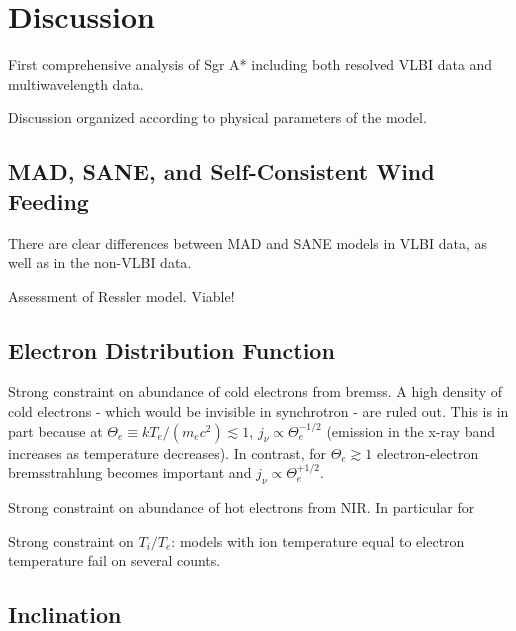 \section{Discussion}\label{sec:discussion}

First comprehensive analysis of Sgr A* including both resolved VLBI data and multiwavelength data.

Discussion organized according to physical parameters of the model.


\subsection{MAD, SANE, and Self-Consistent Wind Feeding}


There are clear differences between MAD and SANE models in VLBI data, as well as in the non-VLBI data.

Assessment of Ressler model.  Viable!

\subsection{Electron Distribution Function}


Strong constraint on abundance of cold electrons from bremss.  A high density of cold electrons - which would be invisible in synchrotron - are ruled out.  This is in part because at $\Theta_e \equiv k T_e/(m_e c^2) \lesssim 1$, $j_\nu \propto \Theta_e^{-1/2}$ (emission in the x-ray band increases as temperature decreases).  In contrast, for $\Theta_e \gtrsim 1$ electron-electron bremsstrahlung becomes important and $j_\nu \propto \Theta_e^{+1/2}$.

Strong constraint on abundance of hot electrons from NIR.  In particular for

Strong constraint on $T_i/T_e$: models with ion temperature equal to electron temperature fail on several counts.

\subsection{Inclination}

